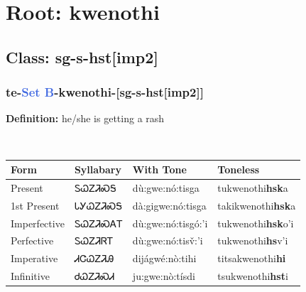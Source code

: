 \needspace{4in}
\section*{Root: kwenothi}
\nopagebreak
{}
\needspace{3in}
\subsection*{Class: sg-s-hst[imp2]}
\nopagebreak
\needspace{2in}
\subsubsection*{te{-}\textcolor{RoyalBlue}{Set B}{-}\textbf{kwenothi}{-}[sg-s-hst[imp2]]}
\nopagebreak
\textbf{Definition: } he/she is getting a rash
\\[0.5em]
\begin{tabularx}{\textwidth}{l X X X}%
\toprule%
\textbf{Form}&\textbf{Syllabary}&\textbf{With Tone}&\textbf{Toneless}\\%
\midrule%
Present&ᏚᏇᏃᏘᏍᎦ&dù:gwe:nó:tisga&tukwenothi\textbf{hsk}a\\%
1st Present&ᏓᎩᏇᏃᏘᏍᎦ&dà:gigwe:nó:tisga&takikwenothi\textbf{hsk}a\\%
Imperfective&ᏚᏇᏃᏘᏍᎪᎢ&dù:gwe:nó:tisgó:’i&tukwenothi\textbf{hsk}o'i\\%
Perfective&ᏚᏇᏃᏘᏒᎢ&dù:gwe:nó:tisv̌:’i&tukwenothi\textbf{hs}v'i\\%
Imperative&ᏗᏣᏇᏃᏘᎯ&dijágwé:nò:tihi&titsakwenothi\textbf{hi}\\%
Infinitive&ᏧᏇᏃᏘᏍᏗ&ju:gwe:nò:tísdi&tsukwenothi\textbf{hst}i\\%
\bottomrule%
\end{tabularx}
\\[1em]